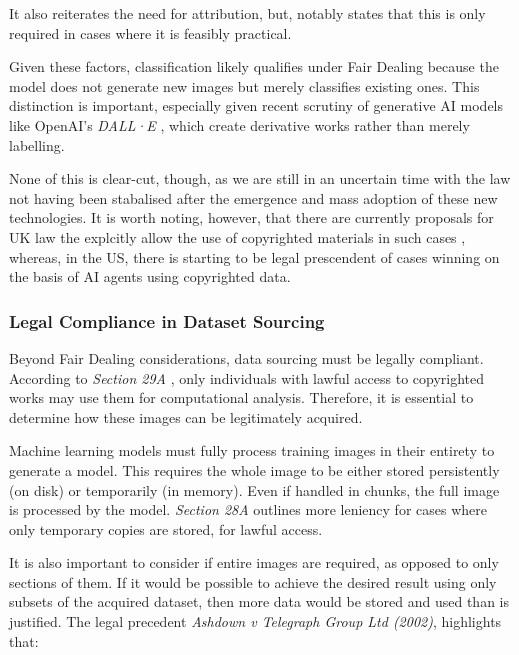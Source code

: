                   It also reiterates the need for attribution, but, notably states that this is only required in cases where it is feasibly practical.
    
                  Given these factors, classification likely qualifies under Fair Dealing because the model does not generate new images but merely classifies existing ones. This distinction is important, especially given recent scrutiny of generative AI models like OpenAI’s \textit{DALL·E} \cite{times2025christies_ai_auction, guardian2025ai_art_auction}, which create derivative works rather than merely labelling.
    
                  None of this is clear-cut, though, as we are still in an uncertain time with the law not having been stabalised after the emergence and mass adoption \cite{bick2024rapid} of these new technologies. It is worth noting, however, that there are currently proposals for UK law the explcitly allow the use of copyrighted materials in such cases \cite{guardian2024uk_ai_copyright}, whereas, in the US, there is starting to be legal prescendent of cases winning on the basis \cite{apnews2025thomson_reuters_ai_case} of AI agents using copyrighted data.
    
              \subsubsection{Legal Compliance in Dataset Sourcing}
    
                  Beyond Fair Dealing considerations, data sourcing must be legally compliant. According to \textit{Section 29A} \cite{cdpa1988}, only individuals with lawful access to copyrighted works may use them for computational analysis. Therefore, it is essential to determine how these images can be legitimately acquired.
    
                  Machine learning models must fully process training images in their entirety to generate a model. This requires the whole image to be either stored persistently (on disk) or temporarily (in memory). Even if handled in chunks, the full image is processed by the model. \textit{Section 28A} outlines more leniency for cases where only temporary copies are stored, for lawful access.
    
                  It is also important to consider if entire images are required, as opposed to only sections of them. If it would be possible to achieve the desired result using only subsets of the acquired dataset, then more data would be stored and used than is justified. The legal precedent \textit{Ashdown v Telegraph Group Ltd (2002)}, highlights that:
    
